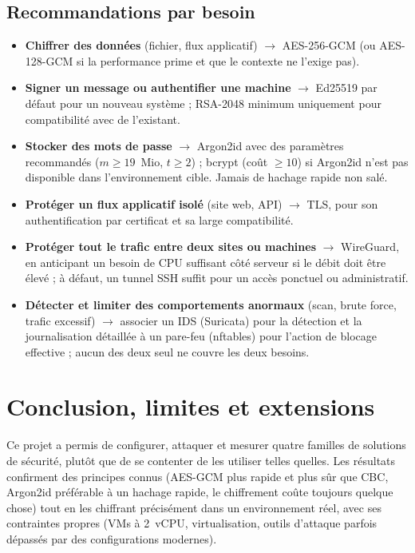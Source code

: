 \documentclass[11pt,a4paper]{article}
\begin{document}
\subsection{Recommandations par besoin}
\begin{itemize}
  \item \textbf{Chiffrer des données} (fichier, flux applicatif) $\rightarrow$ AES-256-GCM (ou
        AES-128-GCM si la performance prime et que le contexte ne l'exige pas).
  \item \textbf{Signer un message ou authentifier une machine} $\rightarrow$ Ed25519 par défaut pour
        un nouveau système ; RSA-2048 minimum uniquement pour compatibilité avec de l'existant.
  \item \textbf{Stocker des mots de passe} $\rightarrow$ Argon2id avec des paramètres recommandés
        ($m \geq 19$~Mio, $t \geq 2$) ; bcrypt (coût $\geq 10$) si Argon2id n'est pas disponible dans
        l'environnement cible. Jamais de hachage rapide non salé.
  \item \textbf{Protéger un flux applicatif isolé} (site web, API) $\rightarrow$ TLS, pour son
        authentification par certificat et sa large compatibilité.
  \item \textbf{Protéger tout le trafic entre deux sites ou machines} $\rightarrow$ WireGuard, en
        anticipant un besoin de CPU suffisant côté serveur si le débit doit être élevé ; à défaut,
        un tunnel SSH suffit pour un accès ponctuel ou administratif.
  \item \textbf{Détecter et limiter des comportements anormaux} (scan, brute force, trafic excessif)
        $\rightarrow$ associer un IDS (Suricata) pour la détection et la journalisation détaillée à un
        pare-feu (nftables) pour l'action de blocage effective ; aucun des deux seul ne couvre les
        deux besoins.
\end{itemize}

\section{Conclusion, limites et extensions}

Ce projet a permis de configurer, attaquer et mesurer quatre familles de solutions de sécurité,
plutôt que de se contenter de les utiliser telles quelles. Les résultats confirment des principes
connus (AES-GCM plus rapide et plus sûr que CBC, Argon2id préférable à un hachage rapide, le
chiffrement coûte toujours quelque chose) tout en les chiffrant précisément dans un environnement
réel, avec ses contraintes propres (VMs à 2~vCPU, virtualisation, outils d'attaque parfois dépassés
par des configurations modernes).
\end{document}
